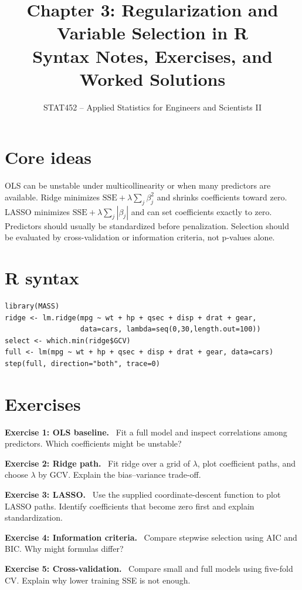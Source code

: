 \documentclass[11pt]{article}
\title{Chapter 3: Regularization and Variable Selection in R\\\large Syntax Notes, Exercises, and Worked Solutions}\author{STAT452 -- Applied Statistics for Engineers and Scientists II}\date{}
\newenvironment{exercise}[1]{\par\medskip\noindent\color{navy}\textbf{Exercise #1.}\color{black}\ }{\par\medskip}\newenvironment{answer}[1]{\par\medskip\noindent\color{green}\textbf{Solution #1.}\color{black}\ }{\hfill$\square$\par\medskip}
\begin{document}
\maketitle\tableofcontents\bigskip
\section{Core ideas}
OLS can be unstable under multicollinearity or when many predictors are available. Ridge minimizes $\mathrm{SSE}+\lambda\sum_j\beta_j^2$ and shrinks coefficients toward zero. LASSO minimizes $\mathrm{SSE}+\lambda\sum_j|\beta_j|$ and can set coefficients exactly to zero. Predictors should usually be standardized before penalization. Selection should be evaluated by cross-validation or information criteria, not p-values alone.
\section{R syntax}
\begin{lstlisting}
library(MASS)
ridge <- lm.ridge(mpg ~ wt + hp + qsec + disp + drat + gear,
                  data=cars, lambda=seq(0,30,length.out=100))
select <- which.min(ridge$GCV)
full <- lm(mpg ~ wt + hp + qsec + disp + drat + gear, data=cars)
step(full, direction="both", trace=0)
\end{lstlisting}
\section{Exercises}
\begin{exercise}{1: OLS baseline} Fit a full model and inspect correlations among predictors. Which coefficients might be unstable?\end{exercise}
\begin{exercise}{2: Ridge path} Fit ridge over a grid of $\lambda$, plot coefficient paths, and choose $\lambda$ by GCV. Explain the bias--variance trade-off.\end{exercise}
\begin{exercise}{3: LASSO} Use the supplied coordinate-descent function to plot LASSO paths. Identify coefficients that become zero first and explain standardization.\end{exercise}
\begin{exercise}{4: Information criteria} Compare stepwise selection using AIC and BIC. Why might formulas differ?\end{exercise}
\begin{exercise}{5: Cross-validation} Compare small and full models using five-fold CV. Explain why lower training SSE is not enough.\end{exercise}
\end{document}
